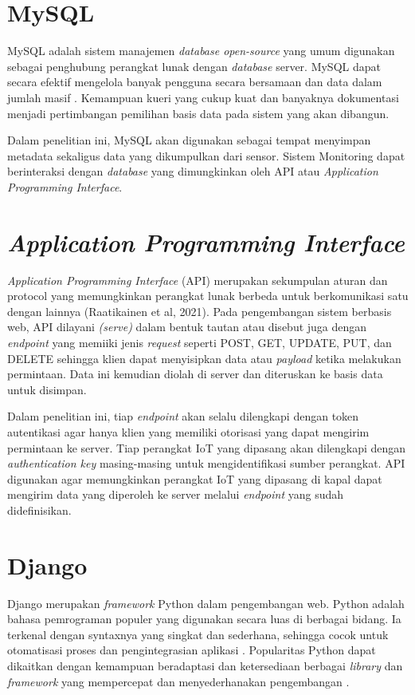 \section{MySQL}

MySQL adalah sistem manajemen \textit{database open-source} yang umum digunakan sebagai penghubung perangkat lunak dengan \textit{database} server. MySQL dapat secara efektif mengelola banyak pengguna secara bersamaan dan data dalam jumlah masif \parencite{article:gomez}. Kemampuan kueri yang cukup kuat dan banyaknya dokumentasi menjadi pertimbangan pemilihan basis data pada sistem yang akan dibangun.

Dalam penelitian ini, MySQL akan digunakan sebagai tempat menyimpan metadata sekaligus data yang dikumpulkan dari sensor. Sistem Monitoring dapat berinteraksi dengan \textit{database} yang dimungkinkan oleh API atau \textit{Application Programming Interface}.


\section{\textit{Application Programming Interface}}
\textit{Application Programming Interface} (API) merupakan sekumpulan aturan dan protocol yang memungkinkan perangkat lunak berbeda untuk berkomunikasi satu dengan lainnya (Raatikainen et al, 2021). Pada pengembangan sistem berbasis web, API dilayani \textit{(serve)} dalam bentuk tautan atau disebut juga dengan \textit{endpoint} yang memiiki jenis \textit{request} seperti POST, GET, UPDATE, PUT, dan DELETE sehingga klien dapat menyisipkan data atau \textit{payload} ketika melakukan permintaan. Data ini kemudian diolah di server dan diteruskan ke basis data untuk disimpan.

Dalam penelitian ini, tiap \textit{endpoint} akan selalu dilengkapi dengan token autentikasi agar hanya klien yang memiliki otorisasi yang dapat mengirim permintaan ke server. Tiap perangkat IoT yang dipasang akan dilengkapi dengan \textit{authentication key} masing-masing untuk mengidentifikasi sumber perangkat. API digunakan agar memungkinkan perangkat IoT yang dipasang di kapal dapat mengirim data yang diperoleh ke server melalui \textit{endpoint} yang sudah didefinisikan.

\section{Django}

Django merupakan \textit{framework} Python dalam pengembangan web. Python adalah bahasa pemrograman populer yang digunakan secara luas di berbagai bidang. Ia terkenal dengan syntaxnya yang singkat dan sederhana, sehingga cocok untuk otomatisasi proses dan pengintegrasian aplikasi \cite{article:buhler}. Popularitas Python dapat dikaitkan dengan kemampuan beradaptasi dan ketersediaan berbagai \textit{library} dan \textit{framework} yang mempercepat dan menyederhanakan pengembangan \cite{article:malloy}.

